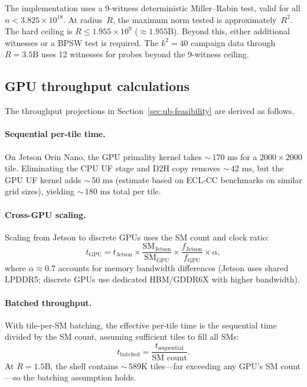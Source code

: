 \documentclass[11pt,a4paper]{article}
\theoremstyle{definition}
\theoremstyle{plain}
\theoremstyle{remark}
\begin{document}
The implementation uses a 9-witness deterministic Miller--Rabin test, valid for all $n < 3.825 \times 10^{18}$.  At radius~$R$, the maximum norm tested is approximately~$R^2$.  The hard ceiling is $R \le 1.955 \times 10^9$ ($\approx 1.955\text{B}$).  Beyond this, either additional witnesses or a BPSW test is required.  The $k^2 = 40$ campaign data through $R = 3.5\text{B}$ uses 12 witnesses for probes beyond the 9-witness ceiling.

\subsection{GPU throughput calculations}\label{app:gpu-throughput}

The throughput projections in Section~\ref{sec:ub-feasibility} are derived as follows.

\paragraph{Sequential per-tile time.}
On Jetson Orin Nano, the GPU primality kernel takes ${\sim}\,170\text{ ms}$ for a $2000 \times 2000$ tile.  Eliminating the CPU UF stage and D2H copy removes ${\sim}\,42\text{ ms}$, but the GPU UF kernel adds ${\sim}\,50\text{ ms}$ (estimate based on ECL-CC benchmarks on similar grid sizes), yielding ${\sim}\,180\text{ ms}$ total per tile.

\paragraph{Cross-GPU scaling.}
Scaling from Jetson to discrete GPUs uses the SM count and clock ratio:
\[
  t_{\text{GPU}} = t_{\text{Jetson}} \times \frac{\text{SM}_{\text{Jetson}}}{\text{SM}_{\text{GPU}}} \times \frac{f_{\text{Jetson}}}{f_{\text{GPU}}} \times \alpha,
\]
where $\alpha \approx 0.7$ accounts for memory bandwidth differences (Jetson uses shared LPDDR5; discrete GPUs use dedicated HBM/GDDR6X with higher bandwidth).

\paragraph{Batched throughput.}
With tile-per-SM batching, the effective per-tile time is the sequential time divided by the SM count, assuming sufficient tiles to fill all SMs:
\[
  t_{\text{batched}} = \frac{t_{\text{sequential}}}{\text{SM count}}.
\]
At $R = 1.5\text{B}$, the shell contains ${\sim}\,589\text{K}$ tiles---far exceeding any GPU's SM count---so the batching assumption holds.
\end{document}
